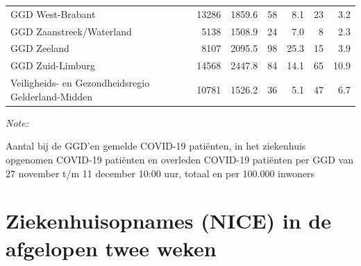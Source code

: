 \documentclass[
  english,
  man,floatsintext]{apa6}
\begin{document}
\begin{table}
\begin{threeparttable}
\begin{tabular}{lrrrrrr}
GGD West-Brabant & 13286 & 1859.6 & 58 & 8.1 & 23 & 3.2\\
GGD Zaanstreek/Waterland & 5138 & 1508.9 & 24 & 7.0 & 8 & 2.3\\
GGD Zeeland & 8107 & 2095.5 & 98 & 25.3 & 15 & 3.9\\
GGD Zuid-Limburg & 14568 & 2447.8 & 84 & 14.1 & 65 & 10.9\\
Veiligheids- en Gezondheidsregio Gelderland-Midden & 10781 & 1526.2 & 36 & 5.1 & 47 & 6.7\\
\bottomrule
\end{tabular}
\begin{tablenotes}
\item \textit{Note: } 
\item Aantal bij de GGD’en gemelde COVID-19 patiënten, in het ziekenhuis opgenomen COVID-19 patiënten en overleden COVID-19 patiënten per GGD van 27 november t/m 11 december 10:00 uur, totaal en per 100.000 inwoners
\end{tablenotes}
\end{threeparttable}
\endgroup{}
\end{table}

\newpage

\hypertarget{ziekenhuisopnames-nice-in-de-afgelopen-twee-weken}{%
\section{Ziekenhuisopnames (NICE) in de afgelopen twee weken}\label{ziekenhuisopnames-nice-in-de-afgelopen-twee-weken}}
\end{document}
